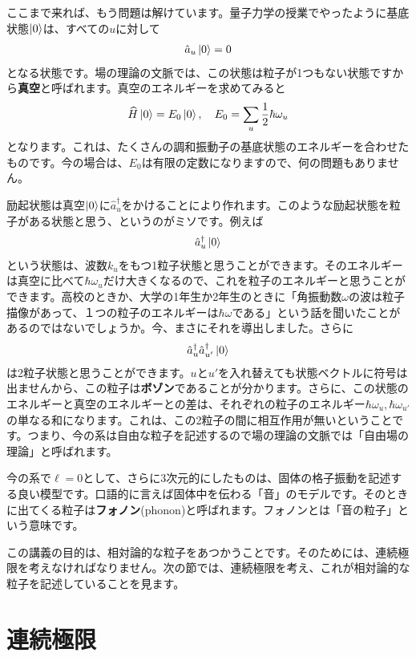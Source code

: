 \documentclass[report,paper=a4, fontsize=12pt, line_length=16cm, number_of_lines=33,dvipdfmx]{jlreq}
\numberwithin{equation}{chapter}
\newcommand{\strong}[1]{{\sffamily \bfseries #1}}
\newcommand{\Hh}{\widehat{H}}
\newcommand{\ah}{\hat{a}}
\begin{document}
ここまで来れば、もう問題は解けています。量子力学の授業でやったように基底状態$\ket{0}$は、すべての$u$に対して
\begin{align}
  \ah_u\ket{0}=0
\end{align}
となる状態です。場の理論の文脈では、この状態は粒子が1つもない状態ですから\strong{真空}と呼ばれます。真空のエネルギーを求めてみると
\begin{align}
  \Hh\ket{0}=E_0\ket{0},\quad E_0=\sum_{u}\frac12 \hbar\omega_{u}
\end{align}
となります。これは、たくさんの調和振動子の基底状態のエネルギーを合わせたものです。今の場合は、$E_0$は有限の定数になりますので、何の問題もありません。

励起状態は真空$\ket{0}$に$\ah_{u}^{\dag}$をかけることにより作れます。このような励起状態を粒子がある状態と思う、というのがミソです。例えば
\begin{align}
  \ah_{u}^{\dag}\ket{0}
\end{align}
という状態は、波数$k_u$をもつ1粒子状態と思うことができます。そのエネルギーは真空に比べて$\hbar \omega_u$だけ大きくなるので、これを粒子のエネルギーと思うことができます。高校のときか、大学の1年生か2年生のときに「角振動数$\omega$の波は粒子描像があって、１つの粒子のエネルギーは$\hbar\omega$である」という話を聞いたことがあるのではないでしょうか。今、まさにそれを導出しました。さらに
\begin{align}
  \ah_{u}^{\dag}\ah_{u'}^{\dag}\ket{0}
\end{align}
は2粒子状態と思うことができます。$u$と$u'$を入れ替えても状態ベクトルに符号は出ませんから、この粒子は\strong{ボゾン}であることが分かります。さらに、この状態のエネルギーと真空のエネルギーとの差は、それぞれの粒子のエネルギー$\hbar\omega_u,\hbar\omega_{u'}$の単なる和になります。これは、この2粒子の間に相互作用が無いということです。つまり、今の系は自由な粒子を記述するので場の理論の文脈では「自由場の理論」と呼ばれます。

今の系で$\ell=0$として、さらに3次元的にしたものは、固体の格子振動を記述する良い模型です。口語的に言えば固体中を伝わる「音」のモデルです。そのときに出てくる粒子は\strong{フォノン}(phonon)と呼ばれます。フォノンとは「音の粒子」という意味です。

この講義の目的は、相対論的な粒子をあつかうことです。そのためには、連続極限を考えなければなりません。次の節では、連続極限を考え、これが相対論的な粒子を記述していることを見ます。

\section{連続極限}
\end{document}
